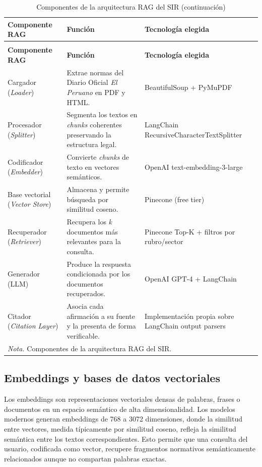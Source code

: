 \documentclass[12pt,a4paper,oneside]{report}
\begin{document}
\begin{longtable}{@{}p{}p{}p{}@{}}
\caption{Componentes de la arquitectura RAG del SIR}\label{tab:componentes-rag-sir}\\
\toprule
\textbf{Componente RAG} & \textbf{Función} & \textbf{Tecnología elegida} \\
\midrule
\endfirsthead
\caption[]{Componentes de la arquitectura RAG del SIR (continuación)}\\
\toprule
\textbf{Componente RAG} & \textbf{Función} & \textbf{Tecnología elegida} \\
\midrule
\endhead
Cargador (\textit{Loader}) & Extrae normas del Diario Oficial \textit{El Peruano} en PDF y HTML. & BeautifulSoup + PyMuPDF \\
Procesador (\textit{Splitter}) & Segmenta los textos en \textit{chunks} coherentes preservando la estructura legal. & LangChain RecursiveCharacterTextSplitter \\
Codificador (\textit{Embedder}) & Convierte \textit{chunks} de texto en vectores semánticos. & OpenAI text-embedding-3-large \\
Base vectorial (\textit{Vector Store}) & Almacena y permite búsqueda por similitud coseno. & Pinecone (free tier) \\
Recuperador (\textit{Retriever}) & Recupera los \textit{k} documentos más relevantes para la consulta. & Pinecone Top-K + filtros por rubro/sector \\
Generador (LLM) & Produce la respuesta condicionada por los documentos recuperados. & OpenAI GPT-4 + LangChain \\
Citador (\textit{Citation Layer}) & Asocia cada afirmación a su fuente y la presenta de forma verificable. & Implementación propia sobre LangChain output parsers \\
\bottomrule
\multicolumn{3}{p{0.96\textwidth}}{\normalsize \textit{Nota.} Componentes de la arquitectura RAG del SIR.}\\
\end{longtable}

\subsection{Embeddings y bases de datos vectoriales}\label{subsec:embeddings-bases-vectoriales}

Los embeddings son representaciones vectoriales densas de palabras, frases o documentos en un espacio semántico de alta dimensionalidad. Los modelos modernos generan embeddings de 768 a 3072 dimensiones, donde la similitud entre vectores, medida típicamente por similitud coseno, refleja la similitud semántica entre los textos correspondientes. Esto permite que una consulta del usuario, codificada como vector, recupere fragmentos normativos semánticamente relacionados aunque no compartan palabras exactas.
\end{document}
